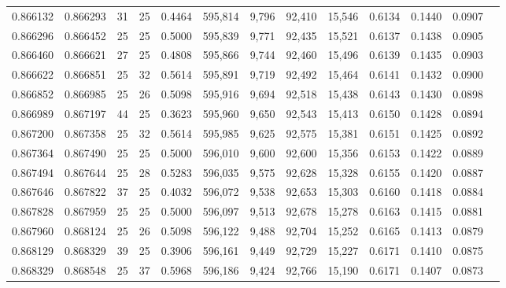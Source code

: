 \begin{tabular}{rrrrrrrrrrrrr}
0.866132 & 0.866293 &    31 &  25 &                                     0.4464 & 595,814 &   9,796 &  92,410 &  15,546 & 0.6134 & 0.1440 & 0.0907 \\
0.866296 & 0.866452 &    25 &  25 &                                     0.5000 & 595,839 &   9,771 &  92,435 &  15,521 & 0.6137 & 0.1438 & 0.0905 \\
0.866460 & 0.866621 &    27 &  25 &                                     0.4808 & 595,866 &   9,744 &  92,460 &  15,496 & 0.6139 & 0.1435 & 0.0903 \\
0.866622 & 0.866851 &    25 &  32 &                                     0.5614 & 595,891 &   9,719 &  92,492 &  15,464 & 0.6141 & 0.1432 & 0.0900 \\
0.866852 & 0.866985 &    25 &  26 &                                     0.5098 & 595,916 &   9,694 &  92,518 &  15,438 & 0.6143 & 0.1430 & 0.0898 \\
0.866989 & 0.867197 &    44 &  25 &                                     0.3623 & 595,960 &   9,650 &  92,543 &  15,413 & 0.6150 & 0.1428 & 0.0894 \\
0.867200 & 0.867358 &    25 &  32 &                                     0.5614 & 595,985 &   9,625 &  92,575 &  15,381 & 0.6151 & 0.1425 & 0.0892 \\
0.867364 & 0.867490 &    25 &  25 &                                     0.5000 & 596,010 &   9,600 &  92,600 &  15,356 & 0.6153 & 0.1422 & 0.0889 \\
0.867494 & 0.867644 &    25 &  28 &                                     0.5283 & 596,035 &   9,575 &  92,628 &  15,328 & 0.6155 & 0.1420 & 0.0887 \\
0.867646 & 0.867822 &    37 &  25 &                                     0.4032 & 596,072 &   9,538 &  92,653 &  15,303 & 0.6160 & 0.1418 & 0.0884 \\
0.867828 & 0.867959 &    25 &  25 &                                     0.5000 & 596,097 &   9,513 &  92,678 &  15,278 & 0.6163 & 0.1415 & 0.0881 \\
0.867960 & 0.868124 &    25 &  26 &                                     0.5098 & 596,122 &   9,488 &  92,704 &  15,252 & 0.6165 & 0.1413 & 0.0879 \\
0.868129 & 0.868329 &    39 &  25 &                                     0.3906 & 596,161 &   9,449 &  92,729 &  15,227 & 0.6171 & 0.1410 & 0.0875 \\
0.868329 & 0.868548 &    25 &  37 &                                     0.5968 & 596,186 &   9,424 &  92,766 &  15,190 & 0.6171 & 0.1407 & 0.0873 \\

\end{tabular}
